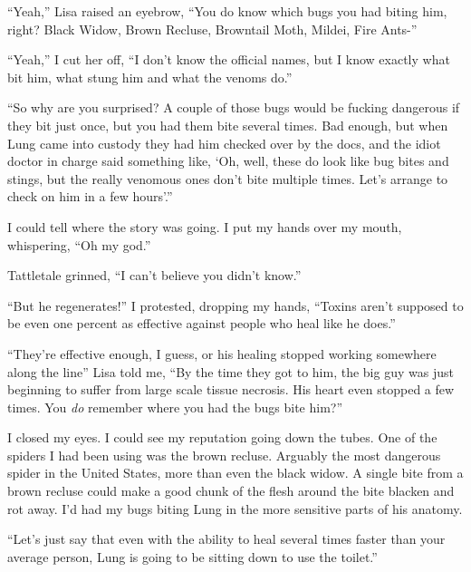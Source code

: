 ``Yeah,'' Lisa raised an eyebrow, ``You do know which bugs you had biting him, right?  Black Widow, Brown Recluse, Browntail Moth, Mildei, Fire Ants-''



``Yeah,'' I cut her off, ``I don't know the official names, but I know exactly what bit him, what stung him and what the venoms do.''



``So why are you surprised?  A couple of those bugs would be fucking dangerous if they bit just once, but you had them bite several times.  Bad enough, but when Lung came into custody they had him checked over by the docs, and the idiot doctor in charge said something like, `Oh, well, these do look like bug bites and stings, but the really venomous ones don't bite multiple times.  Let's arrange to check on him in a few hours'.''



I could tell where the story was going.  I put my hands over my mouth, whispering, ``Oh my god.''



Tattletale grinned, ``I can't believe you didn't know.''



``But he regenerates!'' I protested, dropping my hands, ``Toxins aren't supposed to be even one percent as effective against people who heal like he does.''



``They're effective enough, I guess, or his healing stopped working somewhere along the line'' Lisa told me, ``By the time they got to him, the big guy was just beginning to suffer from large scale tissue necrosis.  His heart even stopped a few times.  You \emph{do} remember where you had the bugs bite him?''



I closed my eyes.  I could see my reputation going down the tubes.  One of the spiders I had been using was the brown recluse.  Arguably the most dangerous spider in the United States, more than even the black widow.  A single bite from a brown recluse could make a good chunk of the flesh around the bite blacken and rot away.  I'd had my bugs biting Lung in the more sensitive parts of his anatomy.



``Let's just say that even with the ability to heal several times faster than your average person, Lung is going to be sitting down to use the toilet.''



